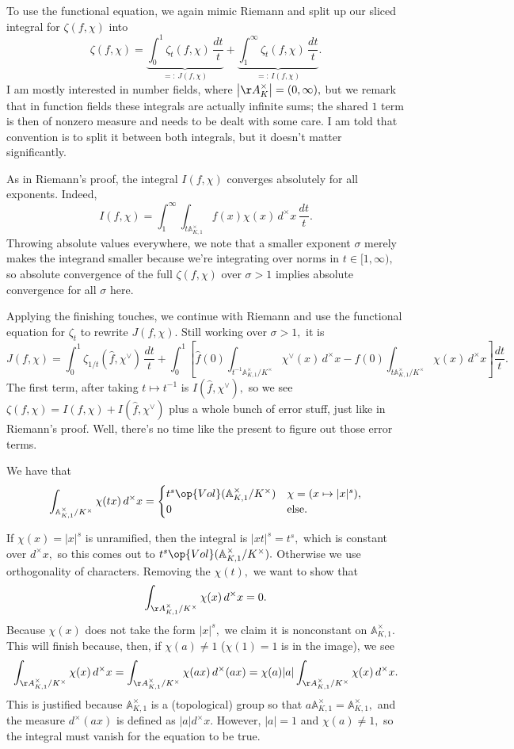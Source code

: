 To use the functional equation, we again mimic Riemann and split up our sliced integral for $\zeta(f,\chi)$ into
\[\zeta(f,\chi)=\underbrace{\int_0^1\zeta_t(f,\chi)\,\frac{dt}t}_{=:\,J(f,\chi)}+\underbrace{\int_1^\infty\zeta_t(f,\chi)\,\frac{dt}t}_{=:\,I(f,\chi)}.\]
I am mostly interested in number fields, where $\left|\AA_K^\times\right|=(0,\infty),$ but we remark that in function fields these integrals are actually infinite sums; the shared $1$ term is then of nonzero measure and needs to be dealt with some care. I am told that convention is to split it between both integrals, but it doesn't matter significantly.

As in Riemann's proof, the integral $I(f,\chi)$ converges absolutely for all exponents. Indeed,
\[I(f,\chi)=\int_1^\infty\int_{t\mathbb A^\times_{K,1}}f(x)\chi(x)\,d^\times x\,\frac{dt}t.\]
Throwing absolute values everywhere, we note that a smaller exponent $\sigma$ merely makes the integrand smaller because we're integrating over norms in $t\in[1,\infty),$ so absolute convergence of the full $\zeta(f,\chi)$ over $\sigma>1$ implies absolute convergence for all $\sigma$ here.

Applying the finishing touches, we continue with Riemann and use the functional equation for $\zeta_t$ to rewrite $J(f,\chi).$ Still working over $\sigma>1,$ it is
\[J(f,\chi)=\int_0^1\zeta_{1/t}(\hat f,\chi^\vee)\,\frac{dt}t+\int_0^1\left[\hat f(0)\int_{t^{-1}\mathbb A^\times_{K,1}/K^\times}\chi^\vee(x)\,d^\times x-f(0)\int_{t\mathbb A^\times_{K,1}/K^\times}\chi(x)\,d^\times x\right]\frac{dt}t.\]
The first term, after taking $t\mapsto t^{-1}$ is $I(\hat f,\chi^\vee),$ so we see $\zeta(f,\chi)=I(f,\chi)+I(\hat f,\chi^\vee)$ plus a whole bunch of error stuff, just like in Riemann's proof. Well, there's no time like the present to figure out those error terms.
\begin{lemma}
    We have that
    \[\int_{\mathbb A^\times_{K,1}/K^\times}\chi(tx)\,d^\times x=\begin{cases}
        t^s\op{Vol}(\mathbb A^\times_{K,1}/K^\times) & \chi=(x\mapsto|x|^s), \\
        0 & \text{else}.
    \end{cases}\]
\end{lemma}
If $\chi(x)=|x|^s$ is unramified, then the integral is $|xt|^s=t^s,$ which is constant over $d^\times x,$ so this comes out to $t^s\op{Vol}(\mathbb A^\times_{K,1}/K^\times).$ Otherwise we use orthogonality of characters. Removing the $\chi(t),$ we want to show that
\[\int_{\AA_{K,1}^\times/K^\times}\chi(x)\,d^\times x=0.\]
Because $\chi(x)$ does not take the form $|x|^s,$ we claim it is nonconstant on $\mathbb A_{K,1}^\times.$ This will finish because, then, if $\chi(a)\ne1$ ($\chi(1)=1$ is in the image), we see
\[\int_{\AA_{K,1}^\times/K^\times}\chi(x)\,d^\times x=\int_{\AA_{K,1}^\times/K^\times}\chi(ax)\,d^\times(ax)=\chi(a)|a|\int_{\AA_{K,1}^\times/K^\times}\chi(x)\,d^\times x.\]
This is justified because $\mathbb A^\times_{K,1}$ is a (topological) group so that $a\mathbb A^\times_{K,1}=\mathbb A^\times_{K,1},$ and the measure $d^\times(ax)$ is defined as $|a|d^\times x.$ However, $|a|=1$ and $\chi(a)\ne1,$ so the integral must vanish for the equation to be true.

